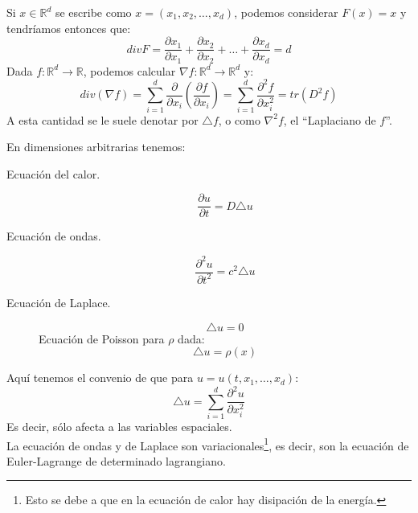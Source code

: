 \begin{ejemplo}
    Si $x\in \mathbb{R}^d$ se escribe como $x=(x_1,x_2,\ldots,x_d)$, podemos considerar $F(x)=x$ y tendríamos entonces que:
    \begin{equation*}
        div F = \frac{\partial x_1}{\partial x_1} + \frac{\partial x_2}{\partial x_2} + \ldots + \frac{\partial x_d}{\partial x_d} = d
    \end{equation*}
    Dada $f:\mathbb{R}^d\to \mathbb{R}$, podemos calcular $\nabla f:\mathbb{R}^d\to \mathbb{R}^d$ y:
    \begin{equation*}
        div(\nabla f) = \sum_{i=1}^{d} \frac{\partial }{\partial x_i}\left(\frac{\partial f}{\partial x_i}\right) = \sum_{i=1}^{d} \frac{\partial^2 f}{\partial x_i^2} = tr(D^2 f)
    \end{equation*}
    A esta cantidad se le suele denotar por $\triangle f$, o como $\nabla^2 f$, el ``Laplaciano de $f$''.
\end{ejemplo}

\noindent
En dimensiones arbitrarias tenemos:
\begin{description}
    \item [Ecuación del calor.] 
        \begin{equation*}
            \frac{\partial u}{\partial t} = D\triangle u
        \end{equation*}
    \item [Ecuación de ondas.] 
        \begin{equation*}
            \frac{\partial^2 u}{\partial t^2} = c^2 \triangle u
        \end{equation*}
    \item [Ecuación de Laplace.]
        \begin{equation*}
            \triangle u = 0
        \end{equation*}
        Ecuación de Poisson para $\rho$ dada:
        \begin{equation*}
            \triangle u = \rho(x)
        \end{equation*}
\end{description}
Aquí tenemos el convenio de que para $u = u(t,x_1,\ldots,x_d)$:
\begin{equation*}
    \triangle u = \sum_{i=1}^d \frac{\partial^2 u}{\partial x_i^2}
\end{equation*}
Es decir, sólo afecta a las variables espaciales.\\

\noindent
La ecuación de ondas y de Laplace son variacionales\footnote{Esto se debe a que en la ecuación de calor hay disipación de la energía.}, es decir, son la ecuación de Euler-Lagrange de determinado lagrangiano.\\

